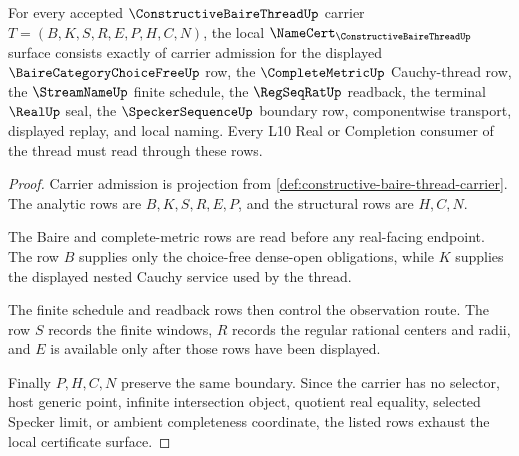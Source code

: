 \begin{theorem}
\label{thm:constructive-baire-thread-namecert-obligations}
For every accepted $\ConstructiveBaireThreadUp$ carrier $T=(B,K,S,R,E,P,H,C,N)$, the local $\NameCert_{\ConstructiveBaireThreadUp}$ surface consists exactly of carrier admission for the displayed $\BaireCategoryChoiceFreeUp$ row, the $\CompleteMetricUp$ Cauchy-thread row, the $\StreamNameUp$ finite schedule, the $\RegSeqRatUp$ readback, the terminal $\RealUp$ seal, the $\SpeckerSequenceUp$ boundary row, componentwise transport, displayed replay, and local naming. Every L10 Real or Completion consumer of the thread must read through these rows.
\end{theorem}
\begin{proof}
Carrier admission is projection from \autoref{def:constructive-baire-thread-carrier}. The analytic rows are $B,K,S,R,E,P$, and the structural rows are $H,C,N$.

The Baire and complete-metric rows are read before any real-facing endpoint. The row $B$ supplies only the choice-free dense-open obligations, while $K$ supplies the displayed nested Cauchy service used by the thread.

The finite schedule and readback rows then control the observation route. The row $S$ records the finite windows, $R$ records the regular rational centers and radii, and $E$ is available only after those rows have been displayed.

Finally $P,H,C,N$ preserve the same boundary. Since the carrier has no selector, host generic point, infinite intersection object, quotient real equality, selected Specker limit, or ambient completeness coordinate, the listed rows exhaust the local certificate surface.
\end{proof}

